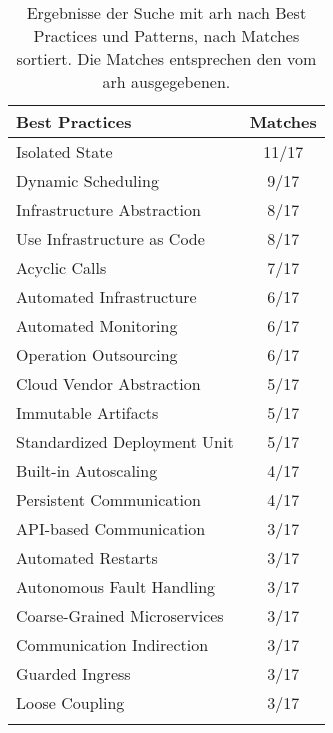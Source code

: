 \begin{table}[!htb]
\begin{minipage}{.5\linewidth}
    \centering
    \begin{tabular}{p{5cm} c}
      \toprule
      \textbf{Best Practices} & \textbf{Matches} \\ \midrule
      Isolated State                        & 11/17 \\ \hline
      Dynamic Scheduling                    & 9/17 \\ \hline
      Infrastructure Abstraction            & 8/17 \\ \hline
      Use Infrastructure as Code            & 8/17 \\ \hline
      Acyclic Calls                         & 7/17 \\ \hline
      Automated Infrastructure              & 6/17 \\ \hline
      Automated Monitoring                  & 6/17 \\ \hline
      Operation Outsourcing                 & 6/17 \\ \hline
      Cloud Vendor Abstraction              & 5/17 \\ \hline
      Immutable Artifacts                   & 5/17 \\ \hline
      Standardized Deployment Unit          & 5/17 \\ \hline
      Built-in Autoscaling                  & 4/17 \\ \hline
      Persistent Communication              & 4/17 \\ \hline
      API-based Communication               & 3/17 \\ \hline
      Automated Restarts                    & 3/17 \\ \hline
      Autonomous Fault Handling             & 3/17 \\ \hline
      Coarse-Grained Microservices          & 3/17 \\ \hline
      Communication Indirection             & 3/17 \\ \hline
      Guarded Ingress                       & 3/17 \\ \hline
      Loose Coupling                        & 3/17 \\ \bottomrule
      \\
    \end{tabular}
  \end{minipage}

  \caption[Best Practices und Patterns Suchergebnisse]{
		Ergebnisse der Suche mit \gls{arh} nach Best Practices und Patterns, nach Matches sortiert.
		Die Matches entsprechen den vom \gls{arh} ausgegebenen.
	}
	\label{tab:phase3-search-results}
\end{table}
